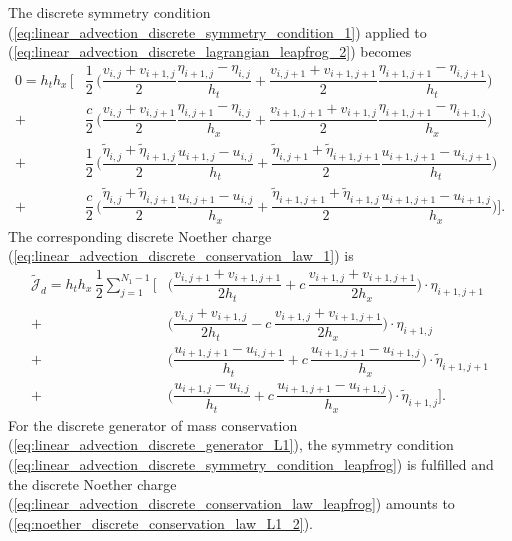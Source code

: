 \documentclass[12pt,a4paper,reqno]{article}
\begin{document}
The discrete symmetry condition (\ref{eq:linear_advection_discrete_symmetry_condition_1}) applied to (\ref{eq:linear_advection_discrete_lagrangian_leapfrog_2}) becomes
\begingroup
\allowdisplaybreaks
\begin{align}\label{eq:linear_advection_discrete_symmetry_condition_leapfrog}
0 = h_{t} h_{x} \, \bigg[ &
\nonumber
\dfrac{1}{2} \, \bigg(
  \dfrac{v_{i, j  } + v_{i+1, j  }}{2} \dfrac{\eta_{i+1, j  } - \eta_{i, j  }}{h_{t}}
+ \dfrac{v_{i, j+1} + v_{i+1, j+1}}{2} \dfrac{\eta_{i+1, j+1} - \eta_{i, j+1}}{h_{t}}
\bigg) \\
\nonumber
+ &
\dfrac{c}{2} \, \bigg(
  \dfrac{v_{i,   j  } + v_{i,   j+1}}{2} \dfrac{\eta_{i,   j+1} - \eta_{i,   j  }}{h_{x}}
+ \dfrac{v_{i+1, j+1} + v_{i+1, j  }}{2} \dfrac{\eta_{i+1, j+1} - \eta_{i+1, j  }}{h_{x}}
\bigg) \\
\nonumber
+ &
\dfrac{1}{2} \, \bigg(
  \dfrac{\tilde{\eta}_{i, j  } + \tilde{\eta}_{i+1, j  }}{2} \dfrac{u_{i+1, j  } - u_{i, j  }}{h_{t}}
+ \dfrac{\tilde{\eta}_{i, j+1} + \tilde{\eta}_{i+1, j+1}}{2} \dfrac{u_{i+1, j+1} - u_{i, j+1}}{h_{t}}
\bigg) \\
+ &
\dfrac{c}{2} \, \bigg(
  \dfrac{\tilde{\eta}_{i,   j  } + \tilde{\eta}_{i,   j+1}}{2} \dfrac{u_{i,   j+1} - u_{i,   j}}{h_{x}}
+ \dfrac{\tilde{\eta}_{i+1, j+1} + \tilde{\eta}_{i+1, j  }}{2} \dfrac{u_{i+1, j+1} - u_{i+1, j}}{h_{x}}
\bigg)
\bigg] .
\end{align}
\endgroup
The corresponding discrete Noether charge (\ref{eq:linear_advection_discrete_conservation_law_1}) is
\begingroup
\allowdisplaybreaks
\begin{align}\label{eq:linear_advection_discrete_conservation_law_leapfrog}
\tilde{\mathcal{J}}_{d} =
h_{t} h_{x} \, \dfrac{1}{2} \sum \limits_{j=1}^{N_{1}-1} \bigg[
\nonumber
  & \bigg( \dfrac{v_{i,  j+1} + v_{i+1,j+1}}{2 h_{t}} + c \, \dfrac{v_{i+1,j} + v_{i+1,j+1}}{2 h_{x}} \bigg) \cdot \eta_{i+1,j+1} \\
\nonumber
+ & \bigg( \dfrac{v_{i,  j  } + v_{i+1,j  }}{2 h_{t}} - c \, \dfrac{v_{i+1,j} + v_{i+1,j+1}}{2 h_{x}} \bigg) \cdot \eta_{i+1,j } \\
\nonumber
+ & \bigg( \dfrac{u_{i+1, j+1} - u_{i, j+1}}{h_{t}} + c \, \dfrac{u_{i+1, j+1} - u_{i+1, j}}{h_{x}} \bigg) \cdot \tilde{\eta}_{i+1, j+1} \\
+ & \bigg( \dfrac{u_{i+1, j  } - u_{i, j  }}{h_{t}} + c \, \dfrac{u_{i+1, j+1} - u_{i+1, j}}{h_{x}} \bigg) \cdot \tilde{\eta}_{i+1, j  }
\bigg] .
\end{align}
\endgroup
For the discrete generator of mass conservation (\ref{eq:linear_advection_discrete_generator_L1}), the symmetry condition (\ref{eq:linear_advection_discrete_symmetry_condition_leapfrog}) is fulfilled and the discrete Noether charge (\ref{eq:linear_advection_discrete_conservation_law_leapfrog}) amounts to (\ref{eq:noether_discrete_conservation_law_L1_2}).
\end{document}

